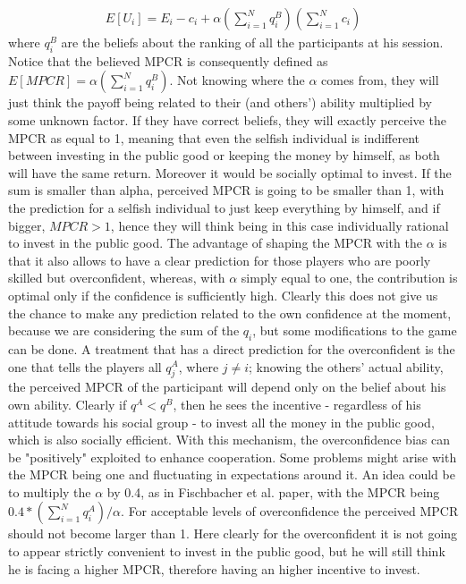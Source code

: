 \documentclass[11pt,twoside,a4paper,leqno]{article}
\begin{document}
\begin{align}
	E[U_{i}] = E_{i} - c_{i} + \alpha(\sum_{i=1}^N q_{i}^B)(\sum_{i=1}^N c_{i})
\end{align}
where $q_{i}^B$ are the beliefs about the ranking of all the participants at his session. Notice that the believed MPCR is consequently defined as $E[MPCR] = \alpha(\sum_{i=1}^N q_{i}^B)$. Not knowing where the $\alpha$ comes from, they will just think the payoff being related to their (and others') ability multiplied by some unknown factor. If they have correct beliefs, they will exactly perceive the MPCR as equal to 1, meaning that even the selfish individual is indifferent between investing in the public good or keeping the money by himself, as both will have the same return. Moreover it would be socially optimal to invest. If the sum is smaller than alpha, perceived MPCR is going to be smaller than 1, with the prediction for a selfish individual to just keep everything by himself, and if bigger, $MPCR > 1$, hence they will think being in this case individually rational to invest in the public good. The advantage of shaping the MPCR with the $\alpha$ is that it also allows to have a clear prediction for those players who are poorly skilled but overconfident, whereas, with $\alpha$ simply equal to one, the contribution is optimal only if the confidence is sufficiently high. Clearly this does not give us the chance to make any prediction related to the own confidence at the moment, because we are considering the sum of the $q_{i}$, but some modifications to the game can be done. A treatment that has a direct prediction for the overconfident is the one that tells the players all $q_{j}^A$, where $j \neq i$; knowing the others' actual ability, the perceived MPCR of the participant will depend only on the belief about his own ability. Clearly if $q^A < q^B$, then he sees the incentive - regardless of his attitude towards his social group - to invest all the money in the public good, which is also socially efficient. With this mechanism, the overconfidence bias can be "positively" exploited to enhance cooperation. \newline
Some problems might arise with the MPCR being one and fluctuating in expectations around it. An idea could be to multiply the $\alpha$ by 0.4, as in Fischbacher et al. paper\textsuperscript{\cite{Fisch}}, with the MPCR being $0.4*(\sum_{i=1}^N q_{i}^A)/\alpha$. For acceptable levels of overconfidence the perceived MPCR should not become larger than 1. Here clearly for the overconfident it is not going to appear strictly convenient to invest in the public good, but he will still think he is facing a higher MPCR, therefore having an higher incentive to invest.\newline
\end{document}

